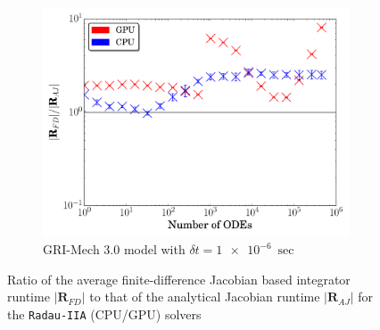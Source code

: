 \documentclass[final,twocolumn]{elsarticle}
\begin{document}
\begin{figure}[htb]
  \\
  \begin{subfigure}{0.49\textwidth}
      \includegraphics[width=\linewidth]{CH4_1e-06_ajac_comp.pdf}
      \caption{GRI-Mech 3.0 model with $\delta t = \SI{1e-6}{\sec}$}
      \label{F:AJ_ch4_small}
  \end{subfigure}
  \caption{Ratio of the average finite-difference Jacobian based integrator runtime $\lvert\textbf{R}_{FD}\rvert$ to that of the analytical Jacobian runtime $\lvert\textbf{R}_{AJ}\rvert$ for the \texttt{Radau-IIA} (CPU\slash GPU) solvers}
  \label{F:AJ_comp}
\end{figure}

% 
\end{document}
